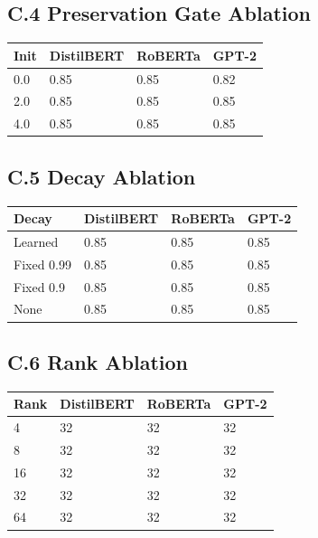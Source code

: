 \subsection{C.4 Preservation Gate Ablation}

\begin{table}[H]
\centering
\small
\begin{tabular}{llll}
\toprule
\textbf{Init} & \textbf{DistilBERT} & \textbf{RoBERTa} & \textbf{GPT-2} \\
\midrule
0.0 & 0.85 & 0.85 & 0.82 \\
2.0 & 0.85 & 0.85 & 0.85 \\
4.0 & 0.85 & 0.85 & 0.85 \\
\bottomrule
\end{tabular}
\end{table}

\subsection{C.5 Decay Ablation}

\begin{table}[H]
\centering
\small
\begin{tabular}{llll}
\toprule
\textbf{Decay} & \textbf{DistilBERT} & \textbf{RoBERTa} & \textbf{GPT-2} \\
\midrule
Learned & 0.85 & 0.85 & 0.85 \\
Fixed 0.99 & 0.85 & 0.85 & 0.85 \\
Fixed 0.9 & 0.85 & 0.85 & 0.85 \\
None & 0.85 & 0.85 & 0.85 \\
\bottomrule
\end{tabular}
\end{table}

\subsection{C.6 Rank Ablation}

\begin{table}[H]
\centering
\small
\begin{tabular}{llll}
\toprule
\textbf{Rank} & \textbf{DistilBERT} & \textbf{RoBERTa} & \textbf{GPT-2} \\
\midrule
4 & 32 & 32 & 32 \\
8 & 32 & 32 & 32 \\
16 & 32 & 32 & 32 \\
32 & 32 & 32 & 32 \\
64 & 32 & 32 & 32 \\
\bottomrule
\end{tabular}
\end{table}


